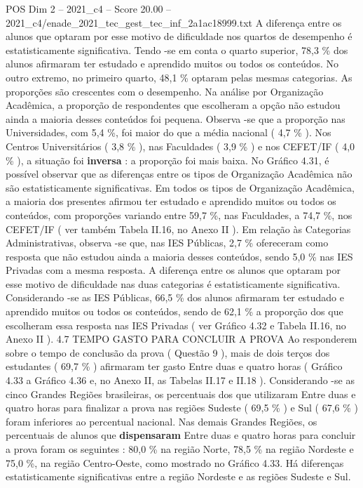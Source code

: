 \begin{textsample}{POS Dim 2 – 2021\_c4 – Score 20.00 – 2021\_c4/enade\_2021\_tec\_gest\_tec\_inf\_2a1ac18999.txt}
A diferença entre os alunos que optaram por esse motivo de dificuldade nos quartos de desempenho é estatisticamente significativa.
Tendo -se em conta o quarto superior, 78,3 \% dos alunos afirmaram ter estudado e aprendido muitos ou todos os conteúdos.
No outro extremo, no primeiro quarto, 48,1 \% optaram pelas mesmas categorias.
As proporções são crescentes com o desempenho.
Na análise por Organização Acadêmica, a proporção de respondentes que escolheram a opção não estudou ainda a maioria desses conteúdos foi pequena.
Observa -se que a proporção nas Universidades, com 5,4 \%, foi maior do que a média nacional ( 4,7 \% ).
Nos Centros Universitários ( 3,8 \% ), nas Faculdades ( 3,9 \% ) e nos CEFET/IF ( 4,0 \% ), a situação foi \textbf{inversa} : a proporção foi mais baixa.
No Gráfico 4.31, é possível observar que as diferenças entre os tipos de Organização Acadêmica não são estatisticamente significativas.
Em todos os tipos de Organização Acadêmica, a maioria dos presentes afirmou ter estudado e aprendido muitos ou todos os conteúdos, com proporções variando entre 59,7 \%, nas Faculdades, a 74,7 \%, nos CEFET/IF ( ver também Tabela II.16, no Anexo II ).
Em relação às Categorias Administrativas, observa -se que, nas IES Públicas, 2,7 \% ofereceram como resposta que não estudou ainda a maioria desses conteúdos, sendo 5,0 \% nas IES Privadas com a mesma resposta.
A diferença entre os alunos que optaram por esse motivo de dificuldade nas duas categorias é estatisticamente significativa.
Considerando -se as IES Públicas, 66,5 \% dos alunos afirmaram ter estudado e aprendido muitos ou todos os conteúdos, sendo de 62,1 \% a proporção dos que escolheram essa resposta nas IES Privadas ( ver Gráfico 4.32 e Tabela II.16, no Anexo II ). 4.7 TEMPO GASTO PARA CONCLUIR A PROVA Ao responderem sobre o tempo de conclusão da prova ( Questão 9 ), mais de dois terços dos estudantes ( 69,7 \% ) afirmaram ter gasto Entre duas e quatro horas ( Gráfico 4.33 a Gráfico 4.36 e, no Anexo II, as Tabelas II.17 e II.18 ).
Considerando -se as cinco Grandes Regiões brasileiras, os percentuais dos que utilizaram Entre duas e quatro horas para finalizar a prova nas regiões Sudeste ( 69,5 \% ) e Sul ( 67,6 \% ) foram inferiores ao percentual nacional.
Nas demais Grandes Regiões, os percentuais de alunos que \textbf{dispensaram} Entre duas e quatro horas para concluir a prova foram os seguintes : 80,0 \% na região Norte, 78,5 \% na região Nordeste e 75,0 \%, na região Centro-Oeste, como mostrado no Gráfico 4.33.
Há diferenças estatisticamente significativas entre a região Nordeste e as regiões Sudeste e Sul.

\end{textsample}
